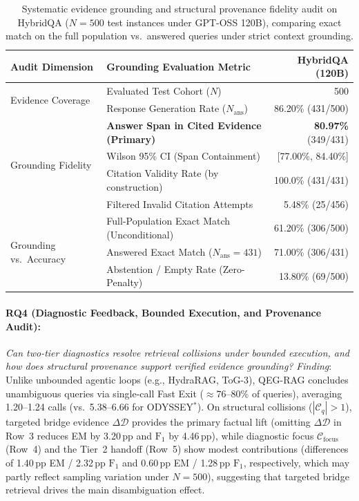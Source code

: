 \documentclass[runningheads]{llncs}
\begin{document}
\begin{table}[t]
\caption{Systematic evidence grounding and structural provenance fidelity audit on HybridQA ($N=500$ test instances under GPT-OSS 120B), comparing exact match on the full population vs.\ answered queries under strict context grounding.}
\label{tab:evidence-audit}
\vspace{1.0mm}
\centering
\scriptsize
\renewcommand{\arraystretch}{0.85}
\setlength{\tabcolsep}{7pt}
\begin{tabular}{@{}llr@{}}
\toprule
Audit Dimension & Grounding Evaluation Metric & HybridQA (120B) \\
\midrule
\multirow{2}{*}{Evidence Coverage} 
  & Evaluated Test Cohort ($N$)                         & 500 \\
  & Response Generation Rate ($N_{\text{ans}}$)           & 86.20\% (431/500) \\
\midrule
\multirow{4}{*}{Grounding Fidelity} 
  & \textbf{Answer Span in Cited Evidence (Primary)}    & \textbf{80.97\%} (349/431) \\
  & Wilson 95\% CI (Span Containment)                   & [77.00\%, 84.40\%] \\
  & Citation Validity Rate (by construction)            & 100.0\% (431/431) \\
  & Filtered Invalid Citation Attempts                  & 5.48\% (25/456) \\
\midrule
\multirow{3}{*}{Grounding vs.\ Accuracy} 
  & Full-Population Exact Match (Unconditional)         & 61.20\% (306/500) \\
  & Answered Exact Match ($N_{\text{ans}}=431$)         & 71.00\% (306/431) \\
  & Abstention / Empty Rate (Zero-Penalty)              & 13.80\% (69/500)  \\
\bottomrule
\end{tabular}
\vspace{1.0mm}
\end{table}

\enlargethispage{6.0\baselineskip}
\paragraph{RQ4 (Diagnostic Feedback, Bounded Execution, and Provenance Audit):}
\emph{Can two-tier diagnostics resolve retrieval collisions under bounded execution, and how does structural provenance support verified evidence grounding?} \emph{Finding}: Unlike unbounded agentic loops (e.g., HydraRAG, ToG-3), QEG-RAG concludes unambiguous queries via single-call Fast Exit ($\approx 76\text{--}80\%$ of queries), averaging 1.20--1.24 calls (vs.\ 5.38--6.66 for ODYSSEY$^*$). On structural collisions ($|\mathcal{C}_q| > 1$), targeted bridge evidence $\Delta\mathcal{D}$ provides the primary factual lift (omitting $\Delta\mathcal{D}$ in Row~3 reduces EM by 3.20\,pp and $\text{F}_1$ by 4.46\,pp), while diagnostic focus $\mathcal{C}_{\text{focus}}$ (Row~4) and the Tier~2 handoff (Row~5) show modest contributions (differences of 1.40\,pp EM / 2.32\,pp $\text{F}_1$ and 0.60\,pp EM / 1.28\,pp $\text{F}_1$, respectively, which may partly reflect sampling variation under $N=500$), suggesting that targeted bridge retrieval drives the main disambiguation effect. 
\end{document}
